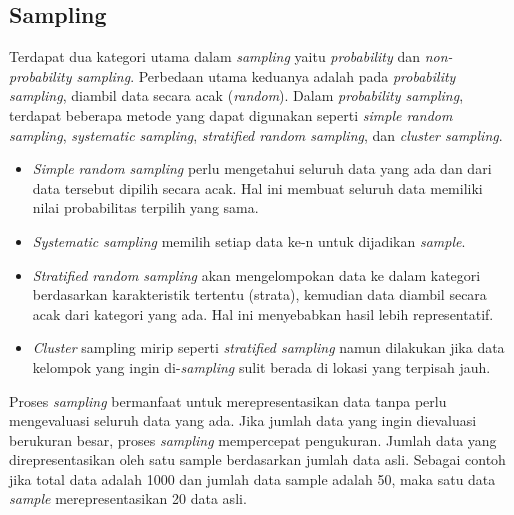 \subsection{Sampling}
Terdapat dua kategori utama dalam \textit{sampling} yaitu \textit{probability} dan \textit{non-probability sampling}. Perbedaan utama keduanya adalah pada \textit{probability sampling}, diambil data secara acak (\textit{random}). Dalam \textit{probability sampling}, terdapat beberapa metode yang dapat digunakan seperti \textit{simple random sampling}, \textit{systematic sampling}, \textit{stratified random sampling}, dan \textit{cluster sampling}.
\begin{itemize}
  \item \textit{Simple random sampling} perlu mengetahui seluruh data yang ada dan dari data tersebut dipilih secara acak. Hal ini membuat seluruh data memiliki nilai probabilitas terpilih yang sama. 
  \item \textit{Systematic sampling} memilih setiap data ke-n untuk dijadikan \textit{sample}. 
  \item \textit{Stratified random sampling} akan mengelompokan data ke dalam kategori berdasarkan karakteristik tertentu (strata), kemudian data diambil secara acak dari kategori yang ada. Hal ini menyebabkan hasil lebih representatif. 
  \item \textit{Cluster} sampling mirip seperti \textit{stratified sampling} namun dilakukan jika data kelompok yang ingin di-\textit{sampling} sulit berada di lokasi yang terpisah jauh.
\end{itemize}

Proses \textit{sampling} bermanfaat untuk merepresentasikan data tanpa perlu mengevaluasi seluruh data yang ada. Jika jumlah data yang ingin dievaluasi berukuran besar, proses \textit{sampling} mempercepat pengukuran. Jumlah data yang direpresentasikan oleh satu sample berdasarkan jumlah data asli. Sebagai contoh jika total data adalah 1000 dan jumlah data sample adalah 50, maka satu data \textit{sample} merepresentasikan 20 data asli.

